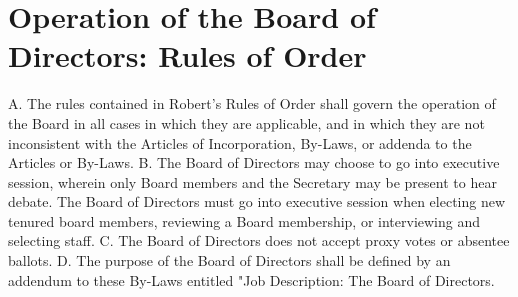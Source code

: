 \documentclass{wst}
\begin{document}
\section{Operation of the Board of Directors: Rules of Order}
A.	The rules contained in Robert's Rules of Order shall govern the operation of the Board in all cases in which they are applicable, and in which they are not inconsistent with the Articles of Incorporation, By-Laws, or addenda to the Articles or By-Laws.
B.	The Board of Directors may choose to go into executive session, wherein only Board members and the Secretary may be present to hear debate.  The Board of Directors must go into executive session when electing new tenured board members, reviewing a Board membership, or interviewing and selecting staff.
C.	The Board of Directors does not accept proxy votes or absentee ballots.
D.	The purpose of the Board of Directors shall be defined by an addendum to these By-Laws entitled "Job Description: The Board of Directors.
\end{document}
